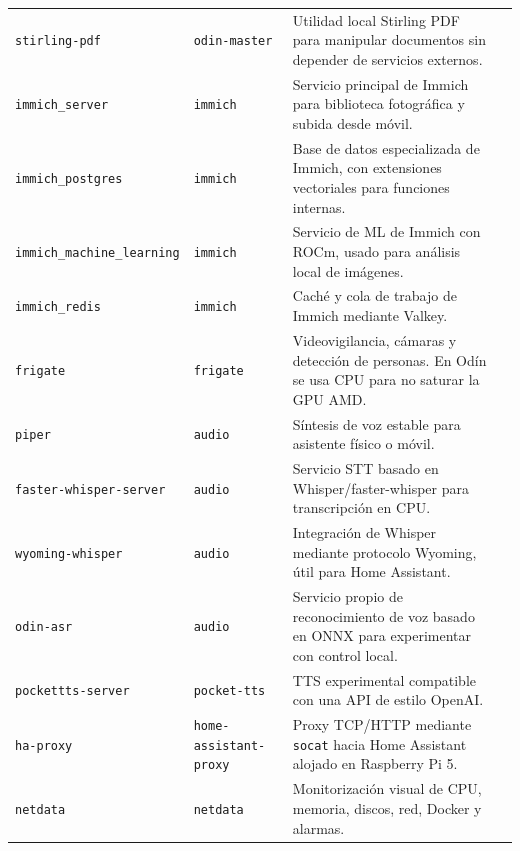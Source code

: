 \begin{longtable}{p{}p{}p{}p{}}
  \texttt{stirling-pdf} & \texttt{odin-master} & Utilidad local Stirling PDF para manipular documentos sin depender de servicios externos. & \citep{stirlingPdfDocs} \\
  \texttt{immich\_server} & \texttt{immich} & Servicio principal de Immich para biblioteca fotográfica y subida desde móvil. & \citep{immichDocs,immichDockerInstall} \\
  \texttt{immich\_postgres} & \texttt{immich} & Base de datos especializada de Immich, con extensiones vectoriales para funciones internas. & \citep{immichDockerInstall,postgres15Docs} \\
  \texttt{immich\_machine\_learning} & \texttt{immich} & Servicio de ML de Immich con ROCm, usado para análisis local de imágenes. & \citep{immichRequirements,rocmDocs} \\
  \texttt{immich\_redis} & \texttt{immich} & Caché y cola de trabajo de Immich mediante Valkey. & \citep{valkeyDocs,immichDockerInstall} \\
  \texttt{frigate} & \texttt{frigate} & Videovigilancia, cámaras y detección de personas. En Odín se usa CPU para no saturar la GPU AMD. & \citep{frigateInstallDocs} \\
  \texttt{piper} & \texttt{audio} & Síntesis de voz estable para asistente físico o móvil. & \citep{linuxserverPiperDocs} \\
  \texttt{faster-whisper-server} & \texttt{audio} & Servicio STT basado en Whisper/faster-whisper para transcripción en CPU. & \citep{speachesDocs} \\
  \texttt{wyoming-whisper} & \texttt{audio} & Integración de Whisper mediante protocolo Wyoming, útil para Home Assistant. & \citep{wyomingProtocolRepo,wyomingWhisperRepo,homeAssistantDocs} \\
  \texttt{odin-asr} & \texttt{audio} & Servicio propio de reconocimiento de voz basado en ONNX para experimentar con control local. & \citep{rocmDocs} \\
  \texttt{pockettts-server} & \texttt{pocket-tts} & TTS experimental compatible con una API de estilo OpenAI. & \citep{openwebuiDocs} \\
  \texttt{ha-proxy} & \texttt{home-assistant-proxy} & Proxy TCP/HTTP mediante \texttt{socat} hacia Home Assistant alojado en Raspberry Pi 5. & \citep{alpineSocatDockerHub,homeAssistantDocs} \\
  \texttt{netdata} & \texttt{netdata} & Monitorización visual de CPU, memoria, discos, red, Docker y alarmas. & \citep{netdataDockerInstall} \\

\end{longtable}
